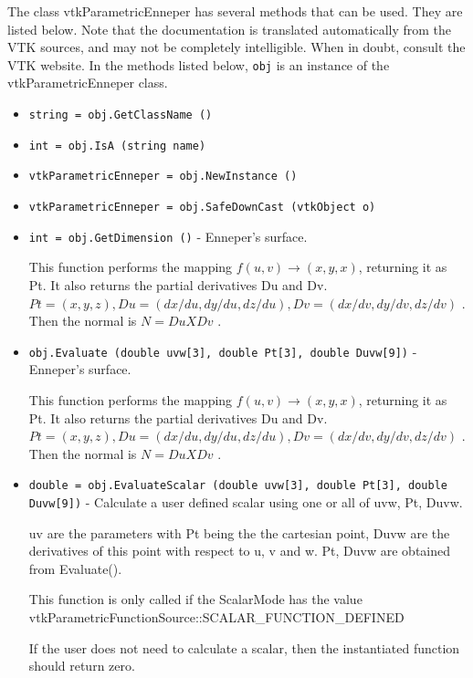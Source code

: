 The class vtkParametricEnneper has several methods that can be used.
  They are listed below.
Note that the documentation is translated automatically from the VTK sources,
and may not be completely intelligible.  When in doubt, consult the VTK website.
In the methods listed below, \verb|obj| is an instance of the vtkParametricEnneper class.
\begin{itemize}
\item  \verb|string = obj.GetClassName ()|

\item  \verb|int = obj.IsA (string name)|

\item  \verb|vtkParametricEnneper = obj.NewInstance ()|

\item  \verb|vtkParametricEnneper = obj.SafeDownCast (vtkObject o)|

\item  \verb|int = obj.GetDimension ()| -  Enneper's surface.

 This function performs the mapping $f(u,v) \rightarrow (x,y,x)$, returning it
 as Pt. It also returns the partial derivatives Du and Dv.
 $Pt = (x, y, z), Du = (dx/du, dy/du, dz/du), Dv = (dx/dv, dy/dv, dz/dv)$ .
 Then the normal is $N = Du X Dv$ .

\item  \verb|obj.Evaluate (double uvw[3], double Pt[3], double Duvw[9])| -  Enneper's surface.

 This function performs the mapping $f(u,v) \rightarrow (x,y,x)$, returning it
 as Pt. It also returns the partial derivatives Du and Dv.
 $Pt = (x, y, z), Du = (dx/du, dy/du, dz/du), Dv = (dx/dv, dy/dv, dz/dv)$ .
 Then the normal is $N = Du X Dv$ .

\item  \verb|double = obj.EvaluateScalar (double uvw[3], double Pt[3], double Duvw[9])| -  Calculate a user defined scalar using one or all of uvw, Pt, Duvw.

 uv are the parameters with Pt being the the cartesian point, 
 Duvw are the derivatives of this point with respect to u, v and w.
 Pt, Duvw are obtained from Evaluate().

 This function is only called if the ScalarMode has the value
 vtkParametricFunctionSource::SCALAR\_FUNCTION\_DEFINED

 If the user does not need to calculate a scalar, then the 
 instantiated function should return zero. 


\end{itemize}
